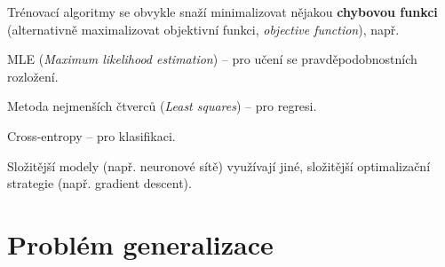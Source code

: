 \begin{compactitem}
    \item Trénovací algoritmy se obvykle snaží minimalizovat nějakou \textbf{chybovou funkci} (alternativně maximalizovat objektivní funkci, \textit{objective function}), např. \begin{compactitem}
        \item MLE (\textit{Maximum likelihood estimation}) -- pro učení se pravděpodobnostních rozložení.

        \item Metoda nejmenších čtverců (\textit{Least squares}) -- pro regresi.

        \item Cross-entropy -- pro klasifikaci.
    \end{compactitem}

    \item Složitější modely (např. neuronové sítě) využívají jiné, složitější optimalizační strategie (např. gradient descent).
\end{compactitem}


\section{Problém generalizace}

